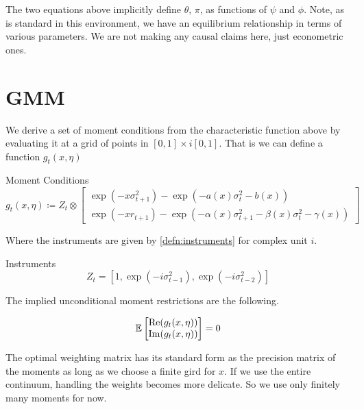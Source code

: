 \documentclass[11pt, letterpaper, twoside, final]{article}
\begin{document}
The two equations above implicitly define $\theta$, $\pi$, as functions of $\psi$ and $\phi$.
Note, as is standard in this environment, we have an equilibrium relationship in terms of various parameters.
We are not making any causal claims here, just econometric ones.


\section{GMM}\label{sec:GMM}

We derive a set of moment conditions from the characteristic function above by evaluating it at a grid of points
in $[0,1] \times i [0,1]$. 
That is we can define a function $g_t(x, \eta)$

\begin{defn}{Moment Conditions}
    \begin{equation}
        g_t(x, \eta) \coloneqq Z_t \otimes \begin{bmatrix} \exp(- x \sigma^2_{t+1}) - \exp\left( - a(x) \sigma_t^2
        - b(x) \right) \\ \exp\left(- x r_{t+1}\right) - \exp\left(- \alpha(x) \sigma^2_{t+1} - \beta(x)
        \sigma^2_t - \gamma(x)\right) \end{bmatrix}
    \end{equation}
\end{defn}

Where the instruments are given by \cref{defn:instruments} for complex unit $i$. 

\begin{defn}{Instruments}
    \label{defn:instruments}
    \begin{equation}
        Z_t = \left[1, \exp\left(- i \sigma_{t-1}^2\right), \exp\left(-i \sigma^2_{t-2}\right)\right] 
    \end{equation}
\end{defn}

The implied unconditional moment restrictions are the following.  

\begin{equation}
    \operatorname{\mathbb{E}} \begin{bmatrix}  \mathrm{Re} (g_t(x, \eta)) \\ \mathrm{Im} (g_t(x, \eta)) \end{bmatrix} = 0
\end{equation}


The optimal weighting matrix has its standard form as the precision matrix of the moments as long as we choose a
finite gird for $x$. 
If we use the entire continuum, handling the weights becomes more delicate. 
So we use only finitely many moments for now.
\end{document}

